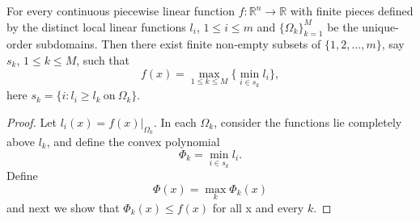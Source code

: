 \bigskip		
\begin{theorem}\label{PWLtoRelu}
	For every continuous piecewise linear function $f:\mathbb{R}^n\to\mathbb{R}$ with finite pieces defined by the distinct local linear functions $l_i$, $1\le i\le m$ and $\{\Omega_k\}_{k=1}^M$ be the unique-order subdomains. Then there exist finite non-empty subsets of $\{1,2,\dots,m\}$, say $s_k$, $1\le k\le M$, such that 
	\begin{equation}
	f(x)=\max_{1\le k\le M}\{\min_{i\in s_k} l_i\},
	\end{equation}
	here $s_k=\{i: l_i\ge l_k\ \mathrm{on}\ \Omega_{k}\}$.
\end{theorem}


\begin{proof}
	Let $l_i(x)=f(x)|_{\Omega_k}$. In each $\Omega_{k}$, consider the functions lie completely above $l_k$, and define the convex polynomial
	$$\Phi_{k}=\min_{i\in s_k} l_i.$$
	Define
	$$\Phi(x)=\max_{k} \Phi_{k}(x)$$
	and next we show that $\Phi_{k}(x)\le f(x)$ for all x and every $k$.
	 

\end{proof}
